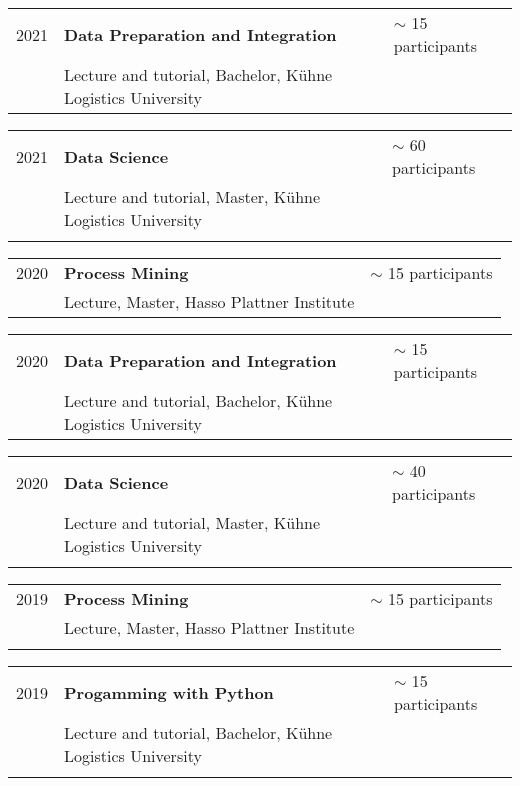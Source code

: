   
\begin{tabular}{P{3cm}P{8cm}P{3cm}}
\\
2021		& \textbf{Data Preparation and Integration}				& $\sim$ 15 participants \\
				& Lecture and tutorial, Bachelor, Kühne Logistics University\\
\end{tabular}
\begin{tabular}{P{3cm}P{8cm}P{3cm}}
\\
2021		& \textbf{Data Science}				& $\sim$ 60 participants \\
				& Lecture and tutorial, Master, Kühne Logistics University\\
				\\
\end{tabular}
\begin{tabular}{P{3cm}P{8cm}P{3cm}}	
2020		& \textbf{Process Mining} & $\sim$ 15 participants \\
				& Lecture, Master, Hasso Plattner Institute \\
\end{tabular}
\begin{tabular}{P{3cm}P{8cm}P{3cm}}
\\
2020		& \textbf{Data Preparation and Integration}				& $\sim$ 15 participants \\
				& Lecture and tutorial, Bachelor, Kühne Logistics University\\
\end{tabular}
\begin{tabular}{P{3cm}P{8cm}P{3cm}}
\\
2020		& \textbf{Data Science}				& $\sim$ 40 participants \\
				& Lecture and tutorial, Master, Kühne Logistics University\\
				\\
\end{tabular}
\begin{tabular}{P{3cm}P{8cm}P{3cm}}	
2019		& \textbf{Process Mining} & $\sim$ 15 participants \\
				& Lecture, Master, Hasso Plattner Institute \\
				\\
\end{tabular}
\begin{tabular}{P{3cm}P{8cm}P{3cm}}	
2019		& \textbf{Progamming with Python}				& $\sim$ 15 participants \\
				& Lecture and tutorial, Bachelor, Kühne Logistics University\\
				\\
\end{tabular}
